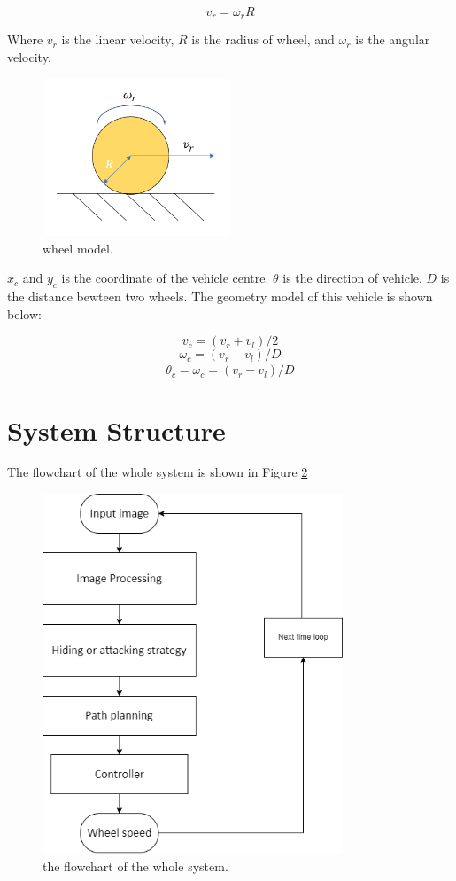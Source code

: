 $$ v_r = \omega_r R $$

Where $v_r$ is the linear velocity, $R$ is the radius of wheel, and $\omega_r$ is the angular velocity.

\begin{figure}[thb]
    \centering
    \includegraphics[width=0.5\textwidth]{images/wheel_model.png}
    \caption[wheel model]{wheel model.}\label{intro}
\end{figure}

$x_c$ and $y_c$ is the coordinate of the vehicle centre. $\theta$ is the direction of vehicle. $D$ is the distance bewteen two wheels. The geometry model of this vehicle is shown below:

$$ v_c = (v_r+v_l)/2 $$
$$ \omega_c = ( v_r - v_l ) / D $$
$$ \dot{\theta_c} = \omega_c = ( v_r - v_l ) / D $$

\section{System Structure}

The flowchart of the whole system is shown in Figure \ref{system_flow}

\begin{figure}[thb]
    \centering
    \includegraphics[width=0.8\textwidth]{images/system_flow.png}
    \caption[the flowchart of the whole system]{the flowchart of the whole system.}\label{system_flow}
\end{figure}

